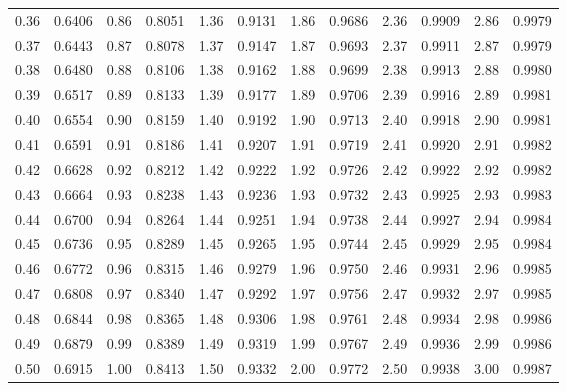\documentclass[12pt,letterpaper]{article}
\begin{document}
\begin{center}
\begin{tabular}{c c | c c | c c | c c | c c | c c}
0.36 & 0.6406 & 0.86 & 0.8051 & 1.36 & 0.9131 & 1.86 & 0.9686 & 2.36 & 0.9909 & 2.86 & 0.9979 \\
0.37 & 0.6443 & 0.87 & 0.8078 & 1.37 & 0.9147 & 1.87 & 0.9693 & 2.37 & 0.9911 & 2.87 & 0.9979 \\
0.38 & 0.6480 & 0.88 & 0.8106 & 1.38 & 0.9162 & 1.88 & 0.9699 & 2.38 & 0.9913 & 2.88 & 0.9980 \\
0.39 & 0.6517 & 0.89 & 0.8133 & 1.39 & 0.9177 & 1.89 & 0.9706 & 2.39 & 0.9916 & 2.89 & 0.9981 \\
0.40 & 0.6554 & 0.90 & 0.8159 & 1.40 & 0.9192 & 1.90 & 0.9713 & 2.40 & 0.9918 & 2.90 & 0.9981 \\
0.41 & 0.6591 & 0.91 & 0.8186 & 1.41 & 0.9207 & 1.91 & 0.9719 & 2.41 & 0.9920 & 2.91 & 0.9982 \\
0.42 & 0.6628 & 0.92 & 0.8212 & 1.42 & 0.9222 & 1.92 & 0.9726 & 2.42 & 0.9922 & 2.92 & 0.9982 \\
0.43 & 0.6664 & 0.93 & 0.8238 & 1.43 & 0.9236 & 1.93 & 0.9732 & 2.43 & 0.9925 & 2.93 & 0.9983 \\
0.44 & 0.6700 & 0.94 & 0.8264 & 1.44 & 0.9251 & 1.94 & 0.9738 & 2.44 & 0.9927 & 2.94 & 0.9984 \\
0.45 & 0.6736 & 0.95 & 0.8289 & 1.45 & 0.9265 & 1.95 & 0.9744 & 2.45 & 0.9929 & 2.95 & 0.9984 \\
0.46 & 0.6772 & 0.96 & 0.8315 & 1.46 & 0.9279 & 1.96 & 0.9750 & 2.46 & 0.9931 & 2.96 & 0.9985 \\
0.47 & 0.6808 & 0.97 & 0.8340 & 1.47 & 0.9292 & 1.97 & 0.9756 & 2.47 & 0.9932 & 2.97 & 0.9985 \\
0.48 & 0.6844 & 0.98 & 0.8365 & 1.48 & 0.9306 & 1.98 & 0.9761 & 2.48 & 0.9934 & 2.98 & 0.9986 \\
0.49 & 0.6879 & 0.99 & 0.8389 & 1.49 & 0.9319 & 1.99 & 0.9767 & 2.49 & 0.9936 & 2.99 & 0.9986 \\
0.50 & 0.6915 & 1.00 & 0.8413 & 1.50 & 0.9332 & 2.00 & 0.9772 & 2.50 & 0.9938 & 3.00 & 0.9987
\end{tabular}
\end{center}
\end{document}
